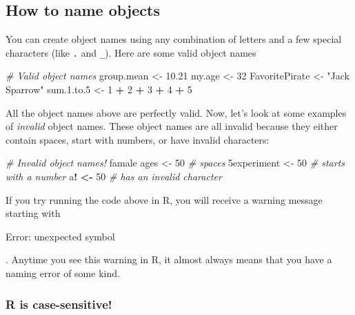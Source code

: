 \documentclass[]{book}
\newenvironment{Shaded}{\begin{snugshade}}{\end{snugshade}}
\newcommand{\DecValTok}[1]{\textcolor[rgb]{0.00,0.00,0.81}{#1}}
\newcommand{\FloatTok}[1]{\textcolor[rgb]{0.00,0.00,0.81}{#1}}
\newcommand{\StringTok}[1]{\textcolor[rgb]{0.31,0.60,0.02}{#1}}
\newcommand{\CommentTok}[1]{\textcolor[rgb]{0.56,0.35,0.01}{\textit{#1}}}
\newcommand{\OperatorTok}[1]{\textcolor[rgb]{0.81,0.36,0.00}{\textbf{#1}}}
\newcommand{\ErrorTok}[1]{\textcolor[rgb]{0.64,0.00,0.00}{\textbf{#1}}}
\newcommand{\NormalTok}[1]{#1}
\theoremstyle{definition}
\theoremstyle{definition}
\theoremstyle{remark}
\begin{document}
\subsection{How to name objects}\label{how-to-name-objects}

You can create object names using any combination of letters and a few
special characters (like \texttt{.} and \texttt{\_}). Here are some
valid object names

\begin{Shaded}
\begin{Highlighting}[]
\CommentTok{# Valid object names}
\NormalTok{group.mean <-}\StringTok{ }\FloatTok{10.21}
\NormalTok{my.age <-}\StringTok{ }\DecValTok{32}
\NormalTok{FavoritePirate <-}\StringTok{ "Jack Sparrow"}
\NormalTok{sum.}\FloatTok{1.}\NormalTok{to.}\DecValTok{5}\NormalTok{ <-}\StringTok{ }\DecValTok{1} \OperatorTok{+}\StringTok{ }\DecValTok{2} \OperatorTok{+}\StringTok{ }\DecValTok{3} \OperatorTok{+}\StringTok{ }\DecValTok{4} \OperatorTok{+}\StringTok{ }\DecValTok{5}
\end{Highlighting}
\end{Shaded}

All the object names above are perfectly valid. Now, let's look at some
examples of \emph{invalid} object names. These object names are all
invalid because they either contain spaces, start with numbers, or have
invalid characters:

\begin{Shaded}
\begin{Highlighting}[]
\CommentTok{# Invalid object names!}
\NormalTok{famale ages <-}\StringTok{ }\DecValTok{50} \CommentTok{# spaces}
\NormalTok{5experiment <-}\StringTok{ }\DecValTok{50} \CommentTok{# starts with a number}
\NormalTok{a}\OperatorTok{!}\StringTok{ }\ErrorTok{<}\OperatorTok{-}\StringTok{ }\DecValTok{50} \CommentTok{# has an invalid character}
\end{Highlighting}
\end{Shaded}

If you try running the code above in R, you will receive a warning
message starting with

Error: unexpected symbol

. Anytime you see this warning in R, it almost always means that you
have a naming error of some kind.

\subsubsection{R is case-sensitive!}\label{r-is-case-sensitive}
\end{document}

